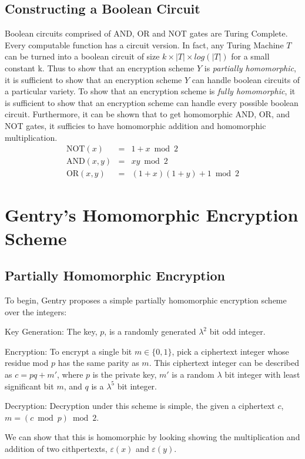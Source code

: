 \documentclass[a4paper,10pt]{article}
\begin{document}
\subsection{Constructing a Boolean Circuit}
Boolean circuits comprised of AND, OR and NOT gates are Turing
Complete. Every computable function has a circuit version. In fact,
any Turing Machine $T$ can be turned into a boolean circuit of size $k
\times |T| \times log(|T|)$ for a small constant k. Thus to show that
an encryption scheme $Y$ is \textit{partially homomorphic}, it is
sufficient to show that an encryption scheme $Y$ can handle boolean
circuits of a particular variety. To show that an encryption scheme is
\textit{fully homomorphic}, it is sufficient to show that an
encryption scheme can handle every possible boolean
circuit. Furthermore, it can be shown that to get homomorphic AND, OR,
and NOT gates, it sufficies to have homomorphic addition and
homomorphic multiplication.
\begin{eqnarray*}
\mathrm{NOT}(x) &=& 1+x \bmod 2\\
\mathrm{AND}(x,y) &=& xy \bmod 2\\
\mathrm{OR}(x,y) &=& (1+x)(1+y) + 1 \bmod 2
\end{eqnarray*}

\section{Gentry's Homomorphic Encryption Scheme}

\subsection{Partially Homomorphic Encryption}
To begin, Gentry proposes a simple partially homomorphic encryption
scheme over the integers:

Key Generation: The key, $p$, is a randomly generated $\lambda^2$ bit
odd integer.

Encryption: To encrypt a single bit $ m \in \{0,1\} $, pick a
ciphertext integer whose residue mod $ p $ has the same parity as
$m$. This ciphertext integer can be described as $ c = pq + m' $,
where $ p $ is the private key, $m'$ is a random $\lambda$ bit integer
with least significant bit $m$, and $q$ is a $\lambda^5$ bit integer.

Decryption: Decryption under this scheme is simple, the given a
ciphertext $c$, $ m = ( c \bmod p) \bmod 2 $.

We can show that this is homomorphic by looking showing the
multiplication and addition of two cithpertexts, $ \varepsilon(x) $
and $ \varepsilon(y) $.
\end{document}
